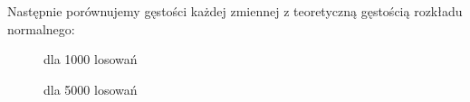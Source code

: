 \documentclass{article}
\begin{document}
\begin{enumerate}
		Następnie porównujemy gęstości każdej zmiennej z teoretyczną gęstością rozkładu normalnego:
		\begin{figure}[h]
			\begin{center}
		
				\caption{dla 1000 losowań}
			\end{center}
		\end{figure} 
	
		\begin{figure}[h]
			\begin{center}
				\caption{dla 5000 losowań}
			\end{center}
		\end{figure} 
	

\end{enumerate}
\end{document}
